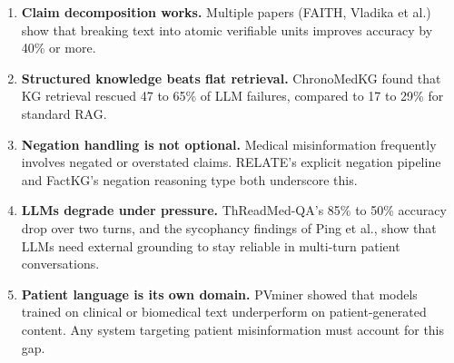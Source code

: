 \documentclass[11pt,a4paper]{article}
\begin{document}
\begin{enumerate}
    \item \textbf{Claim decomposition works.} Multiple papers (FAITH, Vladika et al.) show that breaking text into atomic verifiable units improves accuracy by 40\% or more.
    \item \textbf{Structured knowledge beats flat retrieval.} ChronoMedKG found that KG retrieval rescued 47 to 65\% of LLM failures, compared to 17 to 29\% for standard RAG.
    \item \textbf{Negation handling is not optional.} Medical misinformation frequently involves negated or overstated claims. RELATE's explicit negation pipeline and FactKG's negation reasoning type both underscore this.
    \item \textbf{LLMs degrade under pressure.} ThReadMed-QA's 85\% to 50\% accuracy drop over two turns, and the sycophancy findings of Ping et al., show that LLMs need external grounding to stay reliable in multi-turn patient conversations.
    \item \textbf{Patient language is its own domain.} PVminer showed that models trained on clinical or biomedical text underperform on patient-generated content. Any system targeting patient misinformation must account for this gap.
\end{enumerate}

\newpage
\end{document}
